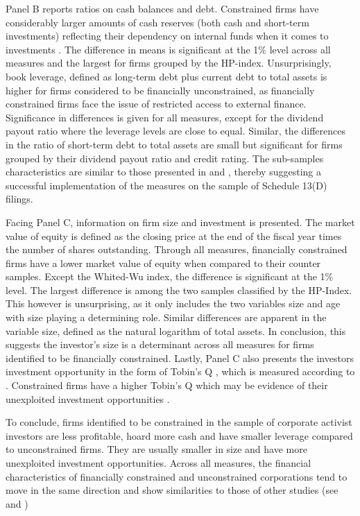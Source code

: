 \documentclass[12pt]{article}
\begin{document}
Panel B reports ratios on cash balances and debt. Constrained firms have considerably larger amounts of cash reserves (both cash and short-term investments) reflecting their dependency on internal funds when it comes to investments \citep[p.142]{Fazzari1988}. The difference in means is significant at the 1\% level across all measures and the largest for firms grouped by the HP-index. Unsurprisingly, book leverage, defined as long-term debt plus current debt to total assets \citep[p.1440]{MacKay2005} is higher for firms considered to be financially unconstrained, as financially constrained firms face the issue of restricted access to external finance. Significance in differences is given for all measures, except for the dividend payout ratio where the leverage levels are close to equal. Similar, the differences in the ratio of short-term debt to total assets are small but significant for firms grouped by their dividend payout ratio and credit rating. The sub-samples characteristics are similar to those presented in \citet[p.544]{Whited2006} and \citet[p.1917]{hadlock2010}, thereby suggesting a successful implementation of the measures on the sample of Schedule 13(D) filings.

Facing Panel C, information on firm size and investment is presented. The market value of equity is defined as the closing price at the end of the fiscal year times the number of shares outstanding. Through all measures, financially constrained firms have a lower market value of equity when compared to their counter samples. Except the Whited-Wu index, the difference is significant at the 1\% level. The largest difference is among the two samples classified by the HP-Index. This however is unsurprising, as it only includes the two variables size and age with size playing a determining role. Similar differences are apparent in the variable size, defined as the natural logarithm of total assets. In conclusion, this suggests the investor's size is a determinant across all measures for firms identified to be financially constrained. Lastly, Panel C also presents the investors investment opportunity in the form of Tobin's Q \citep[p.1441]{MacKay2005}, which is measured according to \citet[p.1]{Khatami2014}. Constrained firms have a higher Tobin's Q which may be evidence of their unexploited investment opportunities \citep[p.539]{Whited2006}.

To conclude, firms identified to be constrained in the sample of corporate activist investors are less profitable, hoard more cash and have smaller leverage compared to unconstrained firms. They are usually smaller in size and have more unexploited investment opportunities. Across all measures, the financial characteristics of financially constrained and unconstrained corporations tend to move in the same direction and show similarities to those of other studies (see \citet[p.544]{Whited2006} and \citet[p.1917]{hadlock2010})
\end{document}
